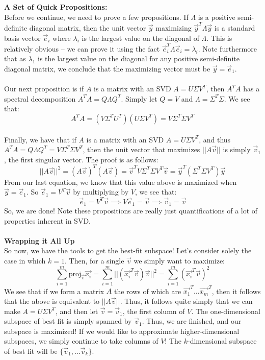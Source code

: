 \documentclass[12pt]{amsart}
\begin{document}
\textbf{A Set of Quick Propositions:}\\
Before we continue, we need to prove a few propositions. If $\Lambda$ is a positive semi-definite diagonal matrix, then the unit vector $\vec{y}$ maximizing $\vec{y}^T \Lambda \vec{y}$ is a standard basis vector $\vec{e}_i$ where $\lambda_i$ is the largest value on the diagonal of $\Lambda$. This is relatively obvious -- we can prove it using the fact $\vec{e}_i^T \Lambda \vec{e}_i = \lambda_i$. Note furthermore that as $\lambda_1$ is the largest value on the diagonal for any positive semi-definite diagonal matrix, we conclude that the maximizing vector must be $\vec{y} = \vec{e}_1$.\\
\\
Our next proposition is if $A$ is a matrix with an SVD $A = U \Sigma V^T$, then $A^TA$ has a spectral decomposition $A^TA = Q\Lambda Q^T$. Simply let $Q=V$ and $\Lambda = \Sigma^T\Sigma$. We see that:
\[A^TA = (V \Sigma^T U^T)(U \Sigma V^T) = V\Sigma^T\Sigma V^T\]
\\
Finally, we have that if $A$ is a matrix with an SVD $A = U \Sigma V^T$, and thus $A^TA = Q\Lambda Q^T = V\Sigma^T\Sigma V^T$, then the unit vector that maximizes $||A\vec{v}||$ is simply $\vec{v}_1$, the first singular vector. The proof is as follows:
\[||A\vec{v}||^2 = (A\vec{v})^T(A\vec{v}) = \vec{v}^TV\Sigma^T\Sigma V^T\vec{v} = \vec{y}^T(\Sigma^T\Sigma V^T)\vec{y}\]
From our last equation, we know that this value above is maximized when $\vec{y} = \vec{e}_1$. So $\vec{e}_1 = V^T\vec{v}$ by multiplying by $V$, we see that:
\[\vec{e}_1 = V^T\vec{v} \implies V\vec{e}_1 = \vec{v} \implies \vec{v}_1 = \vec{v}\]
So, we are done! Note these propositions are really just quantifications of a lot of properties inherent in SVD.\\
\\
\textbf{Wrapping it All Up}\\
So now, we have the tools to get the best-fit subspace! Let's consider solely the case in which $k = 1$. Then, for a single $\vec{v}$ we simply want to maximize:
\[\sum_{i=1}^m\mathrm{proj}_{\vec{v}}{\vec{x_i}} = \sum_{i=1}^m ||(\vec{x_i}^T\vec{v})\vec{v}||^2 = 
\sum_{i=1}^m (\vec{x_i}^T\vec{v})^2\]
We see that if we form a matrix $A$ the rows of which are $\vec{x_1}^T \dots \vec{x_m}^T$, then it follows that the above is equivalent to $||A\vec{v}||$. Thus, it follows quite simply that we can make $A = U \Sigma V^T$, and then let $\vec{v} = \vec{v}_1$, the first column of ${V}$. The one-dimensional subspace of best fit is simply spanned by $\vec{v}_1$. Thus, we are finished, and our subspace is maximized! If we would like to approximate higher-dimensional subspaces, we simply continue to take columns of $V$! The $k$-dimensional subspace of best fit will be $\{\vec{v}_1, \dots \vec{v}_k\}$.
\end{document}
